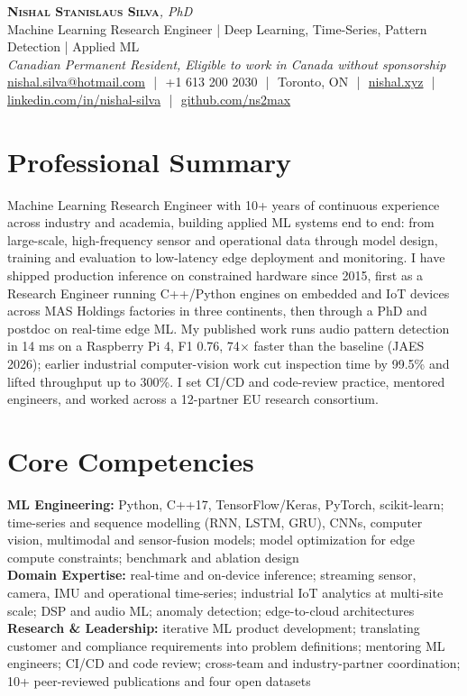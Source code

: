 \documentclass[11pt]{article}
\makeatletter
\newcommand{\cvName}{Nishal Stanislaus Silva}
\newcommand{\cvEmail}{nishal.silva@hotmail.com}
\newcommand{\cvPhone}{+1 613 200 2030}
\newcommand{\cvCity}{Toronto, ON}
\newcommand{\cvSite}{https://nishal.xyz}
\newcommand{\cvLinkedIn}{https://www.linkedin.com/in/nishal-silva}
\newcommand{\cvGitHub}{https://github.com/ns2max}
\newcommand{\cvStatus}{Canadian Permanent Resident, Eligible to work in Canada without sponsorship}
\newcommand{\cvTagline}{Machine Learning Research Engineer | Deep Learning, Time-Series, Pattern Detection | Applied ML}
\makeatother
\begin{document}
\pagestyle{empty}

\begin{center}
    {\LARGE \scshape \textbf{\cvName}}{\large \textit{, PhD}}
    \\[1pt]
    {\small \cvTagline}
    \\[1pt]
    {\footnotesize\textit{\cvStatus}}
    \\[1pt]
    {\small
    \href{mailto:\cvEmail}{\cvEmail}
    \,\,|\,\, \cvPhone
    \,\,|\,\, \cvCity
    \,\,|\,\, \href{\cvSite}{nishal.xyz}
    \,\,|\,\, \href{\cvLinkedIn}{linkedin.com/in/nishal-silva}
    \,\,|\,\, \href{\cvGitHub}{github.com/ns2max}}
\end{center}

\section*{Professional Summary}

Machine Learning Research Engineer with 10+ years of continuous experience across industry and academia, building applied ML systems end to end: from large-scale, high-frequency sensor and operational data through model design, training and evaluation to low-latency edge deployment and monitoring. I have shipped production inference on constrained hardware since 2015, first as a Research Engineer running C++/Python engines on embedded and IoT devices across MAS Holdings factories in three continents, then through a PhD and postdoc on real-time edge ML. My published work runs audio pattern detection in 14 ms on a Raspberry Pi 4, F1 0.76, 74$\times$ faster than the baseline (JAES 2026); earlier industrial computer-vision work cut inspection time by 99.5\% and lifted throughput up to 300\%. I set CI/CD and code-review practice, mentored engineers, and worked across a 12-partner EU research consortium.

\section*{Core Competencies}

\textbf{ML Engineering:} Python, C++17, TensorFlow/Keras, PyTorch, scikit-learn; time-series and sequence modelling (RNN, LSTM, GRU), CNNs, computer vision, multimodal and sensor-fusion models; model optimization for edge compute constraints; benchmark and ablation design\\
\textbf{Domain Expertise:} real-time and on-device inference; streaming sensor, camera, IMU and operational time-series; industrial IoT analytics at multi-site scale; DSP and audio ML; anomaly detection; edge-to-cloud architectures\\
\textbf{Research \& Leadership:} iterative ML product development; translating customer and compliance requirements into problem definitions; mentoring ML engineers; CI/CD and code review; cross-team and industry-partner coordination; 10+ peer-reviewed publications and four open datasets
\end{document}
